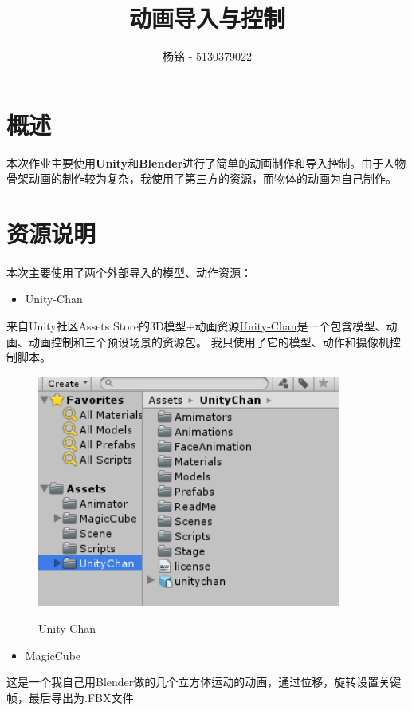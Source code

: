 \documentclass{article}
\title{动画导入与控制}
\author{杨铭 - 5130379022}
\begin{document}
\maketitle
\tableofcontents
\newpage
\section{概述}
本次作业主要使用\textbf{Unity}和\textbf{Blender}进行了简单的动画制作和导入控制。由于人物骨架动画的制作较为复杂，我使用了第三方的资源，而物体的动画为自己制作。
\section{资源说明}
\paragraph{}
本次主要使用了两个外部导入的模型、动作资源：
\begin{itemize}
  \item Unity-Chan
\end{itemize}
来自Unity社区Assets Store的3D模型+动画资源\href{https://www.assetstore.unity3d.com/cn/#!/content/18705}{Unity-Chan}是一个包含模型、动画、动画控制和三个预设场景的资源包。
我只使用了它的模型、动作和摄像机控制脚本。
\begin{figure}[H]
  \centering
  \includegraphics[width=10cm]{assets1.png}\\
  \caption{Unity-Chan}\label{1-1}
\end{figure}
\begin{itemize}
  \item MagicCube
\end{itemize}
这是一个我自己用Blender做的几个立方体运动的动画，通过位移，旋转设置关键帧，最后导出为.FBX文件
\end{document}
